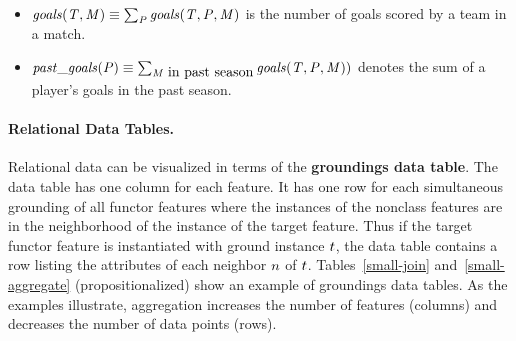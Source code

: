 \documentclass[oribibl]{llncs}%
\newcommand{\team}{T}
\newcommand{\player}{P}
\newcommand{\match}{M}
\newcommand{\plusminus}{\mbox{+/-}}
\begin{document}
\begin{itemize}
\item $\it{goals}(\team,\match) \equiv \sum_{\player} \it{goals}(\team, \player,\match)$ is the number of goals scored by a team in a match.
\item $\it{past}\_\it{goals}(\player) \equiv \sum_{\match \mbox{ in past season}} \it{goals}(\team, \player,\match))$ denotes the sum of a player's goals in the past season.
\end{itemize}


%

\paragraph{Relational Data Tables.}
Relational data can be visualized in terms of the \textbf{groundings data table}. The data table has one column for each feature. It has one row for each simultaneous grounding of all functor features where the instances of the nonclass features are in the neighborhood of the instance of the target feature. Thus if the target functor feature is instantiated with ground instance $t$, the data table contains a row listing the attributes of each neighbor $n$ of $t$. Tables~\ref{small-join} and~\ref{small-aggregate} (propositionalized) show an example of  groundings data tables. As the examples illustrate, aggregation increases the number of features (columns) and decreases the number of data points (rows). 
\end{document}
